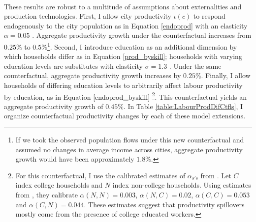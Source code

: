 \documentclass[12pt]{article}
\begin{document}
\paragraph*{}
These results are robust to a multitude of assumptions about externalities and production technologies. First, I allow city productivity $\iota(c)$ to respond endogenously to the city population as in Equation \eqref{endoprod} with an elasticity $\alpha = 0.05$ \citep{Combes_review}. Aggregate productivity growth under the counterfactual increases from $0.25 \%$ to $0.5 \%$\footnote{If we took the observed population flows under this new counterfactual and assumed no changes in average income across cities, aggregate productivity growth would have been approximately $1.8\%$.}. Second, I introduce education as an additional dimension by which households differ as in Equation \eqref{prod_byskill}; households with varying education levels are substitutes with elasticity $\sigma = 1.3$ \citep{card}. Under the same counterfactual, aggregate productivity growth increases by $0.25 \%$. Finally, I allow households of differing education levels to arbitrarily affect labour productivity by education, as in Equation \eqref{endoprod_byskill} \citep{diamond2016}\footnote{For this counterfactual, I use the calibrated estimates of $\alpha_{s's}$ from \cite{efficiency}. Let $C$ index college households and $N$ index non-college households. Using estimates from \cite{diamond2016}, they calibrate $\alpha(N, N) = 0.003$, $\alpha(N, C) = 0.02$, $\alpha(C, C) = 0.053$ and $\alpha(C, N) = 0.044$. These estimates suggest that productivity spillovers mostly come from the presence of college educated workers.}. This counterfactual yields an aggregate productivity growth of $0.45 \%$. In Table \ref{table:LabourProdDifCtfls}, I organize counterfactual productivity changes by each of these model extensions.
\end{document}
